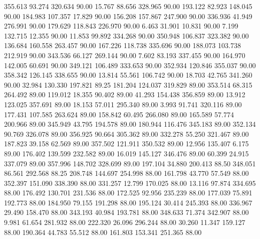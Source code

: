  355.613   93.274  320.634        90.00
  15.767   88.656  328.965        90.00
 193.122   82.923  148.045        90.00
 184.983  107.357   17.829        90.00
 156.208  157.867  247.900        90.00
 336.936   41.949  276.991        90.00
 179.629  118.843  226.970        90.00
   6.463   31.901   10.831        90.00
   7.199  132.715   12.355        90.00
  11.853   99.892  334.268        90.00
 350.948  106.837  323.382        90.00
 136.684  160.558  263.457        90.00
 167.226  118.738  335.696        90.00
 188.073  103.738  212.919        90.00
 343.536   66.127  269.144        90.00
   7.602   83.193  337.455        90.00
 164.970  142.005   60.691        90.00
 349.121  106.489  333.653        90.00
 352.934  120.846  355.037        90.00
 358.342  126.145  338.655        90.00
  13.814   55.561  106.742        90.00
  18.703   42.765  341.260        90.00
  32.984  130.330  197.821        89.25
 181.204  124.037  319.829        89.00
 353.514   68.315  264.492        89.00
 119.012   18.355   90.402        89.00
  41.293  154.438  356.859        89.00
  13.912  123.025  357.691        89.00
  18.153   57.011  295.340        89.00
   3.993   91.741  320.116        89.00
 177.431  107.585  263.624        89.00
 158.842   60.495  266.080        89.00
 165.589   57.774  200.966        89.00
 345.949   43.795  194.578        89.00
 180.944  116.476  345.183        89.00
 352.134   90.769  326.078        89.00
 356.925   90.664  305.362        89.00
 332.278   55.250  321.467        89.00
 187.823   39.158   62.569        89.00
 357.502  121.911  350.532        89.00
  12.956  135.407    6.175        89.00
 176.402  139.599  232.582        89.00
  16.019  145.127  346.476        89.00
  60.399   24.915  337.079        89.00
 357.996  148.702  328.699        89.00
 197.104   34.880  200.413        88.50
 348.051   86.561  292.568        88.25
 208.748  144.697  254.998        88.00
 161.798   43.770   57.549        88.00
 352.397  151.090  338.390        88.00
 331.257   12.799  170.025        88.00
  13.116   97.874  334.695        88.00
 176.492  130.701  231.536        88.00
 172.525   92.956  235.239        88.00
 177.039   75.891  192.773        88.00
 184.950   79.155  191.298        88.00
 195.124   30.414  245.393        88.00
 336.967   29.490  158.470        88.00
 343.193   40.984  193.781        88.00
 348.633   71.374  342.907        88.00
   9.981   61.654  281.932        88.00
 222.320   26.096  296.244        88.00
  30.260   11.347  159.127        88.00
 190.364   44.783   55.512        88.00
 161.803  153.341  251.365        88.00
